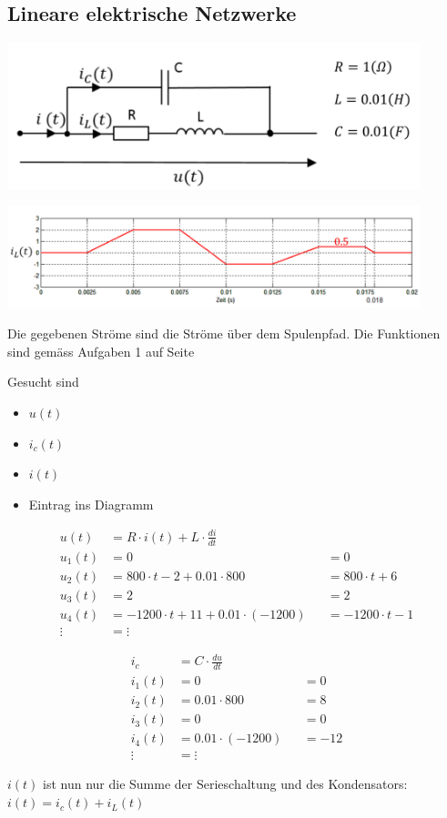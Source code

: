 \newpage
\subsection{Lineare elektrische Netzwerke}
\begin{minipage}{0.35\textwidth}
\includegraphics[width=0.9\textwidth]{bilder/a31.png}
\end{minipage}
\begin{minipage}{0.64\textwidth}
\includegraphics[width=0.9\textwidth]{bilder/a32.png}
\end{minipage}

Die gegebenen Ströme sind die Ströme über dem Spulenpfad. Die Funktionen sind gemäss Aufgaben 1 auf Seite \pageref{ueb1}

Gesucht sind \begin{itemize}
\itemsep0em
\item $u(t)$
\item $i_c(t)$
\item $i(t)$
\item Eintrag ins Diagramm
\end{itemize}

\begin{minipage}{0.49\textwidth}
\begin{align*}
u(t)&=R\cdot i(t)+L\cdot \frac{di}{dt}\\
u_1(t)&=0&&=0\\
u_2(t)&=800\cdot t -2+0.01\cdot 800&&=800\cdot t+6\\
u_3(t)&=2&&=2\\
u_4(t)&=-1200\cdot t+11 +0.01\cdot (-1200)&&=-1200\cdot t -1\\
\vdots&=\vdots
\end{align*}
\end{minipage}
\begin{minipage}{0.49\textwidth}
\begin{align*}
i_c&= C\cdot \frac{du}{dt}\\
i_1(t)&=0&&=0\\
i_2(t)&=0.01\cdot 800&&=8\\
i_3(t)&=0&&=0\\
i_4(t)&=0.01\cdot (-1200)&&=-12\\
\vdots&=\vdots
\end{align*}
\end{minipage}
\vspace{5mm}
$i(t)$ ist nun nur die Summe der Serieschaltung und des Kondensators: $i(t) = i_c(t) + i_L(t)$

